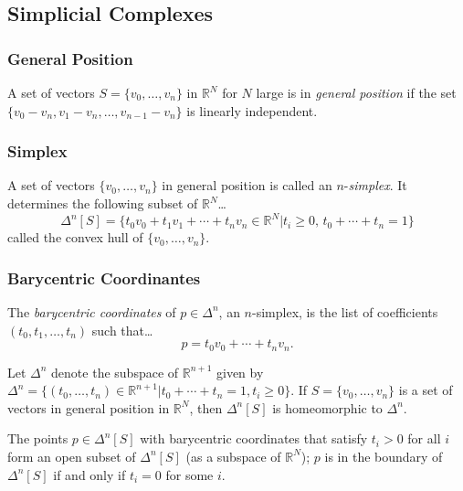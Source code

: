 \subsection{Simplicial Complexes}

\subsubsection{General Position}\label{generalposition}
A set of vectors $S = \{ v_0, \dots, v_n \}$ in $\mathbb{R}^N$ for $N$ large is in \emph{general position}
if the set $\{ v_0 - v_n, v_1 - v_n, \dots, v_{n-1} - v_n \}$ is linearly independent.

\subsubsection{Simplex}\label{simplex}
A set of vectors $\{ v_0, \dots, v_n \}$ in general position is called an $n$-\emph{simplex}. It determines the following subset of $\mathbb{R}^N$\dots
$$\Delta^n[S] = \{t_0 v_0 + t_1 v_1 + \cdots + t_n v_n \in \mathbb{R}^N | t_i \geq 0, \, t_0 + \cdots + t_n = 1 \}$$
called the convex hull of $\{ v_0, \dots, v_n \}$.

\subsubsection{Barycentric Coordinantes}\label{barycentricxy}
The \emph{barycentric coordinates} of $p \in \Delta^n$, an $n$-simplex, is the list of coefficients $(t_0, t_1, \dots, t_n)$
such that\dots
$$p = t_0 v_0 + \cdots + t_n v_n.$$

\begin{proposition}
Let $\Delta^n$ denote the subspace of $\mathbb{R}^{n+1}$ given by $\Delta^n = \{ (t_0, \dots, t_n) \in \mathbb{R}^{n+1} | t_0 + \cdots + t_n = 1, t_i \geq 0 \}.$
If $S = \{ v_0, \dots, v_n \}$ is a set of vectors in general position in $\mathbb{R}^N$, then $\Delta^n[S]$ is homeomorphic to $\Delta^n$.
\end{proposition}

\begin{proposition}
The points $p \in \Delta^n[S]$ with barycentric coordinates that satisfy $t_i > 0$ for all $i$ form an open subset of $\Delta^n[S]$ (as a subspace of $\mathbb{R}^N$);
$p$ is in the boundary of $\Delta^n[S]$ if and only if $t_i = 0$ for some $i$.
\end{proposition}


